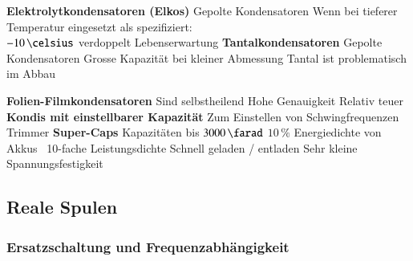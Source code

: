 \begin{minipage}[t]{0.48\columnwidth}
    \begin{outline}
        \1 \textbf{Elektrolytkondensatoren (Elkos)}
            \2 Gepolte Kondensatoren
            \2 Wenn bei tieferer Temperatur eingesetzt als spezifiziert: \\
                $-10 \, \celsius$ verdoppelt Lebenserwartung
        \1 \textbf{Tantalkondensatoren}
            \2 Gepolte Kondensatoren
            \2 Grosse Kapazität bei kleiner Abmessung
            \2 Tantal ist problematisch im Abbau
    \end{outline}
\end{minipage}
\hfill
\begin{minipage}[t]{0.48\columnwidth}
    \begin{outline}
        \1 \textbf{Folien-Filmkondensatoren}
            \2 Sind selbstheilend 
            \2 Hohe Genauigkeit
            \2 Relativ teuer
        \1 \textbf{Kondis mit einstellbarer Kapazität}
            \2 Zum Einstellen von Schwingfrequenzen
            \2 Trimmer
        \1 \textbf{Super-Caps}
            \2 Kapazitäten bis $3000 \, \farad$
            \2 $10 \, \%$ Energiedichte von Akkus
                \textrightarrow\ 10-fache Leistungsdichte 
            \2 Schnell geladen / entladen
            \2 Sehr kleine Spannungsfestigkeit
    \end{outline}
\end{minipage}


\subsection{Reale Spulen}


\subsubsection{Ersatzschaltung und Frequenzabhängigkeit}

